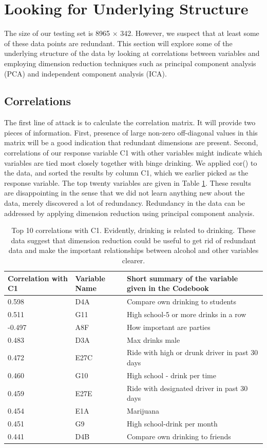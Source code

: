 \section{Looking for Underlying Structure}
\label{sec:PCA}
The size of our testing set is 8965 $\times$ 342. However, we suspect that at least some of these data points are redundant. This section will explore some of the underlying structure of the data by looking at correlations between variables and employing dimension reduction techniques such as principal component analysis (PCA) and independent component analysis (ICA). 
\subsection{Correlations}
The first line of attack is to calculate the correlation matrix. It will provide two pieces of information. First, presence of large non-zero off-diagonal values in this matrix will be a good indication that redundant dimensions are present. Second, correlations of our response variable C1 with other variables might indicate which variables are tied most closely together with binge drinking. We applied cor() to the data, and sorted the results by column C1, which we earlier picked as the response variable. The top twenty variables are given in Table \ref{correlations}. These results are disappointing in the sense that we did not learn anything new about the data, merely discovered a lot of redundancy. Redundancy in the data can be addressed by applying dimension reduction using principal component analysis.

\begin{center}
\begin{table}[ht]
\centering
\begin{tabular}{l l l}
\hline \hline
Correlation with C1 & Variable Name &Short summary of the variable given in the Codebook\\ \hline 
0.598 & D4A	&Compare own drinking to students\\
0.511 & G11	&High school-5 or more drinks in a row\\
-0.497 & A8F	&How important are parties\\
0.483 & D3A	&Max drinks male\\
0.472 & E27C	&Ride with high or drunk driver in past 30 days\\
0.460 & G10	&High school - drink per time\\
0.459 & E27E	&Ride with designated driver in past 30 days\\
0.454 & E1A	&Marijuana\\
0.451 & G9	&High school-drink per month\\
0.441 & D4B	&Compare own drinking to friends\\
\hline
\end{tabular}
\caption{Top 10 correlations with C1. Evidently, drinking is related to drinking. These data suggest that dimension reduction could be useful to get rid of redundant data and make the important relationships between alcohol and other variables clearer.}
\label{correlations}
\end{table}
\end{center}


